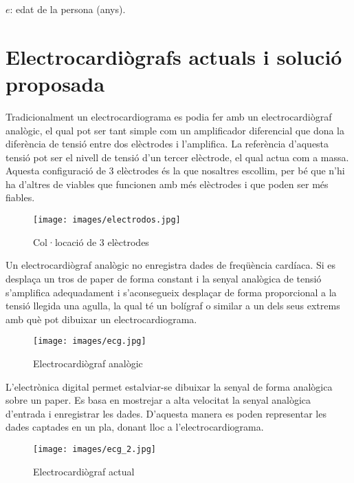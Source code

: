 \noindent $e$: edat de la persona (anys).\\

%
%
%
%
%


\section{Electrocardiògrafs actuals i solució proposada}
Tradicionalment un electrocardiograma es podia fer amb un electrocardiògraf analògic, el qual pot ser tant simple com un amplificador diferencial que dona la diferència de tensió entre dos elèctrodes i l'amplifica. La referència d'aquesta tensió pot ser el nivell de tensió d'un tercer elèctrode, el qual actua com a massa.\\
\newline Aquesta configuració de 3 elèctrodes és la que nosaltres escollim, per bé que n'hi ha d'altres de viables que funcionen amb més elèctrodes i que poden ser més fiables.
\begin{figure}[H]
\begin{center}
\texttt{[image: images/electrodos.jpg]}
\end{center}
\caption{Col·locació de 3 elèctrodes}
\label{fig: electrodes}
\end{figure}
%
%
\noindent Un electrocardiògraf analògic no enregistra dades de freqüència cardíaca. Si es desplaça un tros de paper de forma constant i la senyal analògica de tensió s'amplifica adequadament i s'aconsegueix desplaçar de forma proporcional a la tensió llegida una agulla, la qual té un bolígraf o similar a un dels seus extrems amb què pot dibuixar un electrocardiograma.
\begin{figure}[H]
\begin{center}
\texttt{[image: images/ecg.jpg]}
\end{center}
\caption{Electrocardiògraf analògic}
\label{fig: electrodes}
\end{figure}
\noindent L'electrònica digital permet estalviar-se dibuixar la senyal de forma analògica sobre un paper. Es basa en mostrejar a alta velocitat la senyal analògica d'entrada i enregistrar les dades. D'aquesta manera es poden representar les dades captades en un pla, donant lloc a l'electrocardiograma.
\begin{figure}[H]
\begin{center}
\texttt{[image: images/ecg\_2.jpg]}
\end{center}
\caption{Electrocardiògraf actual}
\label{fig: electrodes}
\end{figure}
